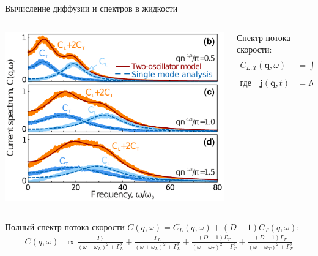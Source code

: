 \documentclass{beamer}
\begin{document}
\begin{frame}{Вычисление диффузии и спектров в жидкости}
\footnotesize{
\begin{columns}
\begin{column}{0.5\linewidth}
\begin{center}
    \includegraphics[width=\textwidth]{CFS-Figure1.png}
  \end{center}

\end{column}

\begin{column}{0.5\linewidth}

Спектр потока скорости:
\begin{align}
    C_{L, T}(\mathbf{q}, \omega)&=\int dt e^{i \omega t} \text{Re} \left\langle\mathbf{j}_{L, T}(\mathbf{q}, t) \mathbf{j}_{L, T}(-\mathbf{q}, 0)\right\rangle \\
    \text{где} \quad \mathbf{j}(\mathbf{q}, t)&=N^{-1} \sum_{s} \mathbf{v}_{s}(t) \exp \left(i \mathbf{q} \mathbf{r}_{s}(t)\right)
\end{align}

\end{column}
\end{columns}


\vspace{0.5cm}

Полный спектр потока скорости $C(q, \omega) = C_L(q, \omega) + (D-1)C_T(q, \omega)$:
\begin{equation}
    \begin{aligned}
    C(q, \omega) & \propto \frac{\Gamma_{L}}{\left(\omega-\omega_{L}\right)^{2}+\Gamma_{L}^{2}}+\frac{\Gamma_{L}}{\left(\omega+\omega_{L}\right)^{2}+\Gamma_{L}^{2}}+\frac{(D-1) \Gamma_{T}}{\left(\omega-\omega_{T}\right)^{2}+\Gamma_{T}^{2}}+\frac{(D-1) \Gamma_{T}}{\left(\omega+\omega_{T}\right)^{2}+\Gamma_{T}^{2}}
\end{aligned}
\label{eq5}
\end{equation}

}
\end{frame}
\end{document}
